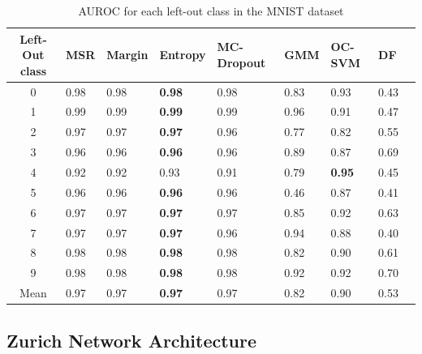 \documentclass[10pt]{article}
\begin{document}
\begin{table}[H]
    \centering
    \begin{tabular}{@{}cllllllll@{}}
    \toprule
    Left-Out class & \gls{MSR}  & Margin & Entropy & \gls{MC-Dropout} & \gls{GMM}  & \gls{OC-SVM}  & \gls{DF}                 \\ \midrule
    0              & 0.98 & 0.98 & \textbf{0.98}& 0.98 & 0.83 & 0.93 & 0.43 \\
    1              & 0.99 & 0.99 & \textbf{0.99}& 0.99 & 0.96 & 0.91 & 0.47\\
    2              & 0.97 & 0.97 & \textbf{0.97} & 0.96 & 0.77 & 0.82 & 0.55 \\
    3              & 0.96 & 0.96 & \textbf{0.96} & 0.96 & 0.89 & 0.87 & 0.69 \\
    4              & 0.92 & 0.92 & 0.93 & 0.91 & 0.79 & \textbf{0.95} & 0.45\\
    5              & 0.96 & 0.96 & \textbf{0.96} & 0.96 & 0.46 & 0.87 & 0.41 \\
    6              & 0.97 & 0.97 & \textbf{0.97} & 0.97 & 0.85 & 0.92 & 0.63\\
    7              & 0.97 & 0.97 & \textbf{0.97} & 0.96 & 0.94 & 0.88 & 0.40\\
    8              & 0.98 & 0.98 & \textbf{0.98} & 0.98 & 0.82 & 0.90 & 0.61\\
    9              & 0.98 & 0.98 & \textbf{0.98} & 0.98 & 0.92 & 0.92 & 0.70 \\\midrule
    Mean           & 0.97 & 0.97 & \textbf{0.97} & 0.97 & 0.82 & 0.90 & 0.53 \\\bottomrule
    \end{tabular}
    \caption{\gls{AUROC} for each left-out class in the \gls{MNIST} dataset}
    \label{table:mnist-auroc-nd}
\end{table}


\subsection{Zurich Network Architecture}
\end{document}
